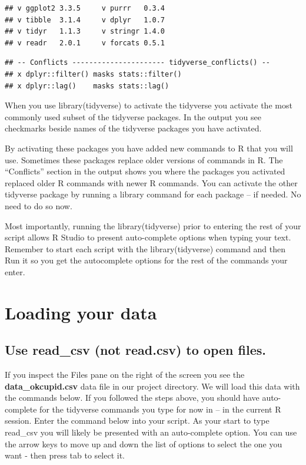 \documentclass[
]{krantz}
\begin{document}
\begin{verbatim}
## v ggplot2 3.3.5     v purrr   0.3.4
## v tibble  3.1.4     v dplyr   1.0.7
## v tidyr   1.1.3     v stringr 1.4.0
## v readr   2.0.1     v forcats 0.5.1
\end{verbatim}

\begin{verbatim}
## -- Conflicts ---------------------- tidyverse_conflicts() --
## x dplyr::filter() masks stats::filter()
## x dplyr::lag()    masks stats::lag()
\end{verbatim}

When you use library(tidyverse) to activate the tidyverse you activate the most commonly used subset of the tidyverse packages. In the output you see checkmarks beside names of the tidyverse packages you have activated.

By activating these packages you have added new commands to R that you will use. Sometimes these packages replace older versions of commands in R. The ``Conflicts'' section in the output shows you where the packages you activated replaced older R commands with newer R commands. You can activate the other tidyverse package by running a library command for each package -- if needed. No need to do so now.

Most importantly, running the library(tidyverse) prior to entering the rest of your script allows R Studio to present auto-complete options when typing your text. Remember to start each script with the library(tidyverse) command and then Run it so you get the autocomplete options for the rest of the commands your enter.

\hypertarget{loading-your-data}{%
\section{Loading your data}\label{loading-your-data}}

\hypertarget{use-read_csv-not-read.csv-to-open-files.}{%
\subsection{Use read\_csv (not read.csv) to open files.}\label{use-read_csv-not-read.csv-to-open-files.}}

If you inspect the Files pane on the right of the screen you see the \textbf{data\_okcupid.csv} data file in our project directory. We will load this data with the commands below. If you followed the steps above, you should have auto-complete for the tidyverse commands you type for now in -- in the current R session. Enter the command below into your script. As your start to type read\_csv you will likely be presented with an auto-complete option. You can use the arrow keys to move up and down the list of options to select the one you want - then press tab to select it.
\end{document}
